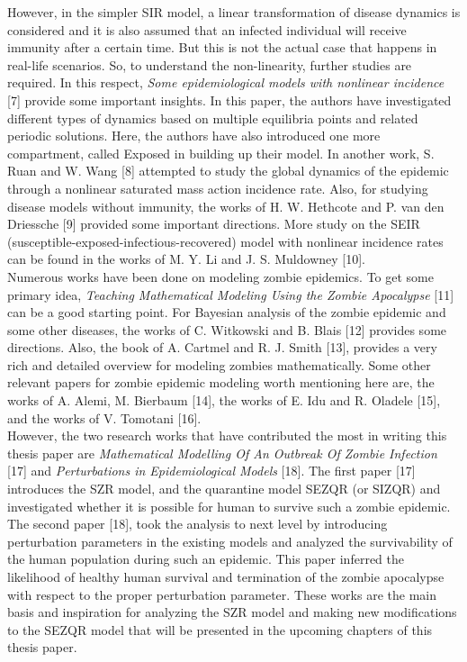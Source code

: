     However, in the simpler SIR model, a linear transformation of disease dynamics is considered and it is also assumed that an infected individual will receive immunity after a certain time. But this is not the actual case that happens in real-life scenarios. So, to understand the non-linearity, further studies are required. In this respect, \emph{Some epidemiological models with nonlinear incidence} [7] provide some important insights. In this paper, the authors have investigated different types of dynamics based on multiple equilibria points and related periodic solutions. Here, the authors have also introduced one more compartment, called Exposed in building up their model. In another work, S. Ruan and W. Wang [8] attempted to study the global dynamics of the epidemic through a nonlinear saturated mass action incidence rate. Also, for studying disease models without immunity, the works of H. W. Hethcote and P. van den Driessche [9] provided some important directions. More study on the SEIR (susceptible-exposed-infectious-recovered) model with nonlinear incidence rates can be found in the works of M. Y. Li and J. S. Muldowney [10]. \\


Numerous works have been done on modeling zombie epidemics. To get some primary idea, \emph{Teaching Mathematical Modeling Using the Zombie Apocalypse} [11] can be a good starting point. For Bayesian analysis of the zombie epidemic and some other diseases, the works of C. Witkowski and B. Blais [12] provides some directions.  Also, the book of A. Cartmel and R. J. Smith [13], provides a very rich and detailed overview for modeling zombies mathematically. Some other relevant papers for zombie epidemic modeling worth mentioning here are, the works of A. Alemi, M. Bierbaum [14], the works of E. Idu and R. Oladele [15], and the works of V. Tomotani [16]. \\


However, the two research works that have contributed the most in writing this thesis paper are \emph{Mathematical Modelling Of An Outbreak Of Zombie Infection} [17] and \emph{Perturbations in Epidemiological Models} [18]. The first paper [17] introduces the SZR model, and the quarantine model SEZQR (or SIZQR) and investigated whether it is possible for human to survive such a zombie epidemic. The second paper [18], took the analysis to next level by introducing perturbation parameters in the existing models and analyzed the survivability of the human population during such an epidemic. This paper inferred the likelihood of healthy human survival and termination of the zombie apocalypse with respect to the proper perturbation parameter. These works are the main basis and inspiration for analyzing the SZR model and making new modifications to the SEZQR model that will be presented in the upcoming chapters of this thesis paper.

